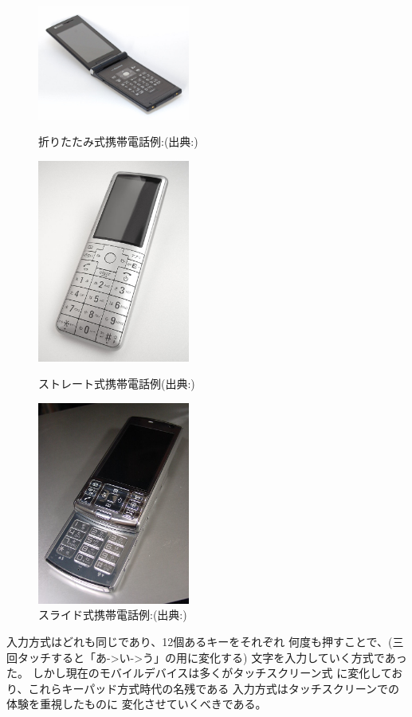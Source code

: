 \begin{figure}[htbp]
  \begin{minipage}{0.3\hsize}
    \begin{center}
      \includegraphics[width=50mm,bb=0 0 1024 768]{images/oritatami.png}
    \end{center}
    \caption{折りたたみ式携帯電話例:(出典:\cite{keitai})}
    \label{fig:oritatami}
  \end{minipage}
  \begin{minipage}{0.3\hsize}
    \begin{center}
      \includegraphics[width=50mm,bb=0 0 147 196]{images/straight.png}
    \end{center}
    \caption{ストレート式携帯電話例(出典:\cite{keitai})}
    \label{fig:straight}
  \end{minipage}
  \begin{minipage}{0.3\hsize}
    \begin{center}
      \includegraphics[width=50mm,bb=0 0 154 205]{images/slide.png}
    \end{center}
    \caption{スライド式携帯電話例:(出典:\cite{keitai})}
    \label{fig:slide}
  \end{minipage}
\end{figure}
入力方式はどれも同じであり、12個あるキーをそれぞれ
何度も押すことで、(三回タッチすると「あ->い->う」の用に変化する)
文字を入力していく方式であった。
しかし現在のモバイルデバイスは多くがタッチスクリーン式
に変化しており、これらキーパッド方式時代の名残である
入力方式はタッチスクリーンでの体験を重視したものに
変化させていくべきである。\cite{designinginterface}

